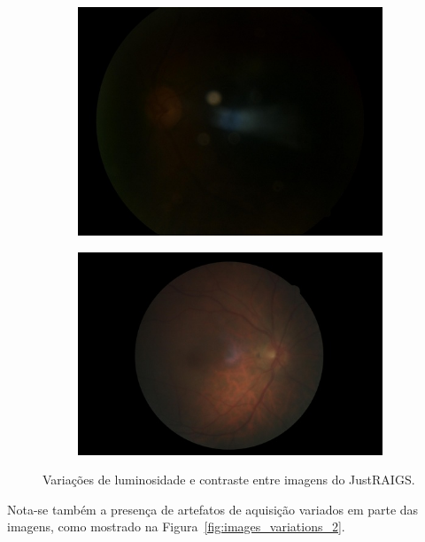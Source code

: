 \documentclass[12pt]{article}
\begin{document}
\begin{figure}
\begin{subfigure}[b]{0.2\textwidth}
        \includegraphics[width=\textwidth]{images/examples_from_dataset/TRAIN013211.JPG}
        \label{fig:images_variations_1_3}
    \end{subfigure}
    \hfill
    \begin{subfigure}[b]{0.2\textwidth}
        \centering
        \includegraphics[width=\textwidth]{images/examples_from_dataset/TRAIN061871.JPG}
        \label{fig:images_variations_1_4}
    \end{subfigure}
    \caption{Variações de luminosidade e contraste entre imagens do JustRAIGS.}
    \label{fig:images_variations_1}
\end{figure}

Nota-se também a presença de artefatos de aquisição variados em parte das imagens, como mostrado na Figura~\ref{fig:images_variations_2}.
\end{document}
